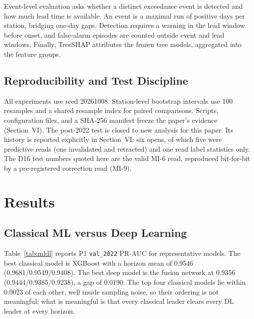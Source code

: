 \documentclass[conference]{IEEEtran}
\begin{document}
Event-level evaluation asks whether a distinct exceedance event is detected and how much lead time is available. An event is a maximal run of positive days per station, bridging one-day gaps. Detection requires a warning in the lead window before onset, and false-alarm episodes are counted outside event and lead windows. Finally, TreeSHAP \cite{lundberg2017unified} attributes the frozen tree models, aggregated into the feature groups.

\subsection{Reproducibility and Test Discipline}

All experiments use seed 20261008. Station-level bootstrap intervals use 100 resamples and a shared resample index for paired comparisons. Scripts, configuration files, and a SHA-256 manifest freeze the paper's evidence (Section~VI). The post-2022 test is closed to new analysis for this paper. Its history is reported explicitly in Section~VI: six opens, of which five were predictive reads (one invalidated and retracted) and one read label statistics only. The D16 test numbers quoted here are the valid MI-6 read, reproduced bit-for-bit by a pre-registered correction read (MI-9).

\section{Results}

\subsection{Classical ML versus Deep Learning}

Table~\ref{tab:mldl} reports P1 \texttt{val\_2022} PR-AUC for representative models. The best classical model is XGBoost with a horizon mean of 0.9546 (0.9681/0.9549/0.9408). The best deep model is the fusion network at 0.9356 (0.9444/0.9385/0.9238), a gap of 0.0190. The top four classical models lie within 0.0023 of each other, well inside sampling noise, so their ordering is not meaningful; what is meaningful is that every classical leader clears every DL leader at every horizon.
\end{document}
